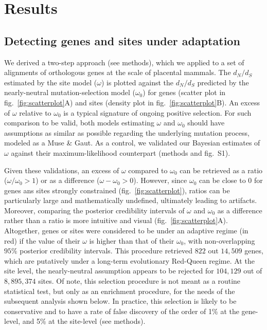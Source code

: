 \documentclass[9pt,twocolumn,twoside,lineno]{pnas-new}
\newcommand{\dn}{d_N}
\newcommand{\ds}{d_S}
\newcommand{\dnds}{\dn / \ds}
\begin{document}
\section*{Results}\label{sec:results}
\subsection*{Detecting genes and sites under adaptation}
We derived a two-step approach (see methods), which we applied to a set of alignments of orthologous genes at the scale of placental mammals.
The $\dnds$ estimated by the site model ($\omega$) is plotted against the $\dnds$ predicted by the nearly-neutral mutation-selection model ($\omega_{0}$) for genes (scatter plot in fig.~\ref{fig:scatterplot}A) and sites (density plot in fig.~\ref{fig:scatterplot}B).
An excess of $\omega$ relative to $\omega_{0}$ is a typical signature of ongoing positive selection\cite{bloom_identification_2017, rodrigue_detecting_2017}.
For such comparison to be valid, both models estimating $\omega$ and $\omega_{0}$ should have assumptions as similar as possible regarding the underlying mutation process, modeled as a Muse \& Gaut\cite{muse_likelihood_1994, spielman_relationship_2015}.
As a control, we validated our Bayesian estimates of $\omega$ against their maximum-likelihood counterpart (methods and fig.~S1).

Given these validations, an excess of $\omega$ compared to $\omega_{0}$ can be retrieved as a ratio ($\omega / \omega_{0} > 1$) or as a difference ($\omega - \omega_{0}>0$).
However, since $\omega_{0}$ can be close to $0$ for genes ans sites strongly constrained (fig.~\ref{fig:scatterplot}), ratios can be particularly large and mathematically undefined, ultimately leading to artifacts.
Moreover, comparing the posterior credibility intervals of $\omega$ and $\omega_{0}$ as a difference rather than a ratio is more intuitive and visual (fig.~\ref{fig:scatterplot}A).
Altogether, genes or sites were considered to be under an adaptive regime (in red) if the value of their $\omega$ is higher than that of their $\omega_{0}$, with non-overlapping $95\%$ posterior credibility intervals.
This procedure retrieved $822$ out $14,509$ genes, which are putatively under a long-term evolutionary Red-Queen regime.
At the site level, the nearly-neutral assumption appears to be rejected for $104,129$ out of $8,895,374$ sites.
Of note, this selection procedure is not meant as a routine statistical test, but only as an enrichment procedure, for the needs of the subsequent analysis shown below.
In practice, this selection is likely to be conservative and to have a rate of false discovery of the order of 1\% at the gene-level, and 5\% at the site-level (see methods).
\end{document}
